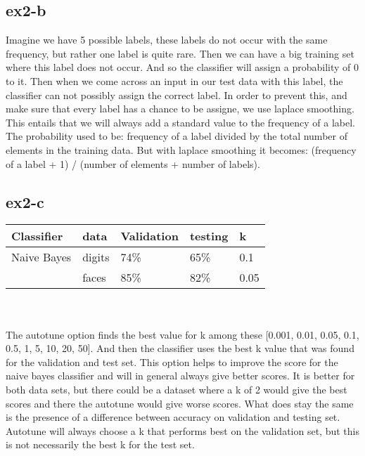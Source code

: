 \subsection{ex2-b}
Imagine we have 5 possible labels, these labels do not occur with the same frequency, but rather
one label is quite rare. Then we can have a big training set where this label does not occur. 
And so the classifier will assign a probability of 0 to it. Then when we come across an input
in our test data with this label, the classifier can not possibly assign the correct label.
In order to prevent this, and make sure that every label has a chance to be assigne, we use 
laplace smoothing. 
This entails that we will always add a  standard value to the frequency of a label. 
The probability used to be: frequency of a label divided by the total number of elements 
in the training data. But with laplace smoothing it becomes: (frequency of a label + 1) /
 (number of elements + number of labels).

\subsection{ex2-c}
\begin{table}[]
\begin{tabular}{|l|l||l|l||l|}
\hline
Classifier    & data   & Validation & testing & k \\ \hline
Naive Bayes   & digits & 74\%       & 65\%    & 0.1 \\ 
              & faces  & 85\%       & 82\%    & 0.05 \\ \hline
\end{tabular}
\end{table}
\\
\\
The autotune option finds the best value for k among these [0.001, 0.01, 0.05, 0.1, 0.5, 
1, 5, 10, 20, 50]. And then the classifier uses the best k value that was found for the
validation and test set. 
This option helps to improve the score for the naive bayes classifier and will in general 
always give better scores. It is better for both data sets, but there could be a dataset 
where a k of 2 would give the best scores and there the autotune would give worse scores.
What does stay the same is the presence of a difference between accuracy on validation and 
testing set. Autotune will always choose a k that performs best on the validation set, 
but this is not necessarily the best k for the test set.

